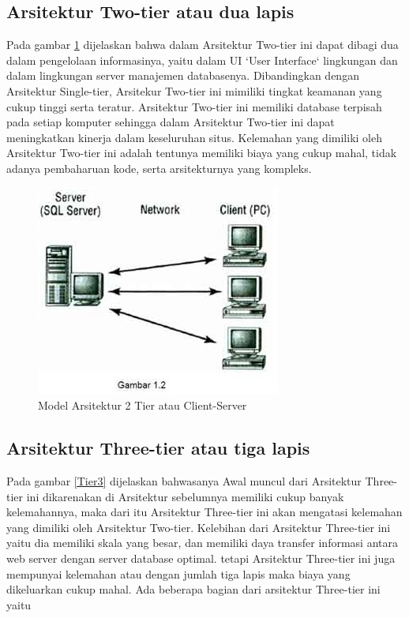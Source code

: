 \subsection{Arsitektur Two-tier atau dua lapis}
Pada gambar \ref{Tier2} dijelaskan bahwa dalam Arsitektur Two-tier ini dapat dibagi dua dalam pengelolaan informasinya, yaitu dalam UI `User Interface` lingkungan dan dalam
lingkungan server manajemen databasenya. Dibandingkan dengan Arsitektur Single-tier, Arsitekur Two-tier ini mimiliki tingkat
keamanan yang cukup tinggi serta teratur. Arsitektur Two-tier ini memiliki database terpisah pada setiap komputer sehingga dalam
Arsitektur Two-tier ini dapat meningkatkan kinerja dalam keseluruhan situs. Kelemahan yang dimiliki oleh Arsitektur Two-tier ini
adalah tentunya memiliki biaya yang cukup mahal, tidak adanya pembaharuan kode, serta arsitekturnya yang kompleks.

\begin{figure}[h]
    \centerline{\includegraphics{figures/2model2tier.JPG}}
    \caption{Model Arsitektur 2 Tier atau Client-Server}
    \label{Tier2}
\end{figure}

\subsection{Arsitektur Three-tier atau tiga lapis}
    Pada gambar \ref{Tier3} dijelaskan bahwasanya Awal muncul dari Arsitektur Three-tier ini dikarenakan 
di Arsitektur sebelumnya memiliki cukup banyak kelemahannya, maka dari itu Arsitektur Three-tier ini akan mengatasi kelemahan yang 
dimiliki oleh Arsitektur Two-tier. Kelebihan dari Arsitektur Three-tier ini yaitu dia memiliki skala yang besar, dan memiliki daya 
transfer informasi antara web server dengan server database optimal. tetapi Arsitektur Three-tier ini juga mempunyai kelemahan atau dengan jumlah tiga lapis maka biaya yang dikeluarkan cukup mahal. Ada beberapa bagian dari arsitektur Three-tier ini yaitu 


